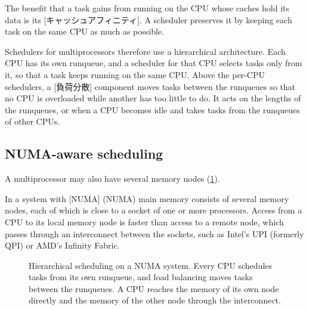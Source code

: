 \documentclass[../main.tex]{subfiles}
\begin{document}
\begin{definition}
  The benefit that a task gains from running on the CPU whose caches hold
  its data is its [キャッシュアフィニティ].  A scheduler
  preserves it by keeping each task on the same CPU as much as possible.
\end{definition}

Schedulers for multiprocessors therefore use a hierarchical architecture.
Each CPU has its own runqueue, and a scheduler for that CPU selects tasks
only from it, so that a task keeps running on the same CPU.  Above the
per-CPU schedulers, a [負荷分散] component moves tasks
between the runqueues so that no CPU is overloaded while another has too
little to do.  It acts on the lengths of the runqueues, or when a CPU becomes
idle and takes tasks from the runqueues of other CPUs.

\subsection{NUMA-aware scheduling}

A multiprocessor may also have several memory nodes
(\cref{fig:l07-numa}).

\begin{definition}[NUMA]
  In a system with [NUMA]%
   (NUMA) main memory consists
  of several memory nodes, each of which is close to a socket of one or more
  processors.  Access from a CPU to its local memory node is faster than
  access to a remote node, which passes through an interconnect between the
  sockets, such as Intel's UPI (formerly QPI) or AMD's Infinity Fabric.
\end{definition}

\begin{figure}[htbp]
  \centering
  
  \caption{Hierarchical scheduling on a NUMA system.  Every CPU schedules
    tasks from its own runqueue, and load balancing moves tasks between the
    runqueues.  A CPU reaches the memory of its own node directly and the
    memory of the other node through the interconnect.}
  \label{fig:l07-numa}
\end{figure}
\end{document}
